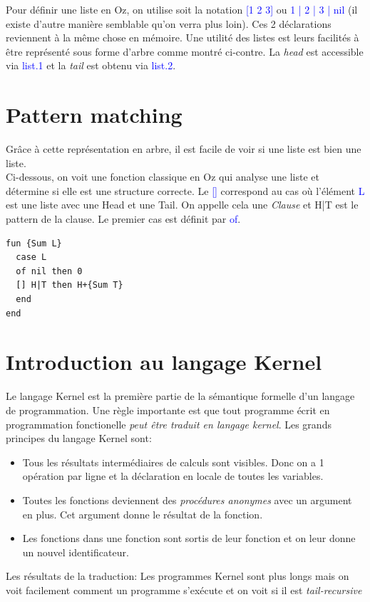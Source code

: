 \documentclass{report}
\begin{document}
Pour définir une liste en Oz, on utilise soit la notation \textcolor{blue}{[1 2 3]} ou \textcolor{blue}{1 | 2 | 3 | nil} (il existe d'autre manière semblable qu'on verra plus loin). Ces 2 déclarations reviennent à la même chose en mémoire. Une utilité des listes est leurs facilités à être représenté sous forme d'arbre comme montré ci-contre. La \textit{head} est accessible via \textcolor{blue}{list.1} et la \textit{tail} est obtenu via \textcolor{blue}{list.2}.

\section{Pattern matching}

Grâce à cette représentation en arbre, il est facile de voir si une liste est bien une liste.\\
Ci-dessous, on voit une fonction classique en Oz qui analyse une liste et détermine si elle est une structure correcte. Le \textcolor{blue}{[]} correspond au cas où l'élément \textcolor{blue}{L} est une liste avec une Head et une Tail. On appelle cela une \textit{Clause} et H|T est le pattern de la clause. Le premier cas est définit par \textcolor{blue}{of}.
\begin{lstlisting}[escapechar=\%]
fun {Sum L}
  case L
  of nil then 0
  [] H|T then H+{Sum T}
  end
end
\end{lstlisting}
\newpage

\section{Introduction au langage Kernel}
Le langage Kernel est la première partie de la sémantique formelle d'un langage de programmation. Une règle importante est que tout programme écrit en programmation fonctionelle \textit{peut être traduit en langage kernel}.
Les grands principes du langage Kernel sont:
\begin{itemize}
	\item Tous les résultats intermédiaires de calculs sont visibles. Donc on a 1 opération par ligne et la déclaration en locale de toutes les variables.
	\item Toutes les fonctions deviennent des \textit{procédures anonymes} avec un argument en plus. Cet argument donne le résultat de la fonction.
	\item Les fonctions dans une fonction sont sortis de leur fonction et on leur donne un nouvel identificateur.
\end{itemize}
Les résultats de la traduction: Les programmes Kernel sont plus longs mais on voit facilement comment un programme s'exécute et on voit si il est \textit{tail-recursive}
\end{document}
